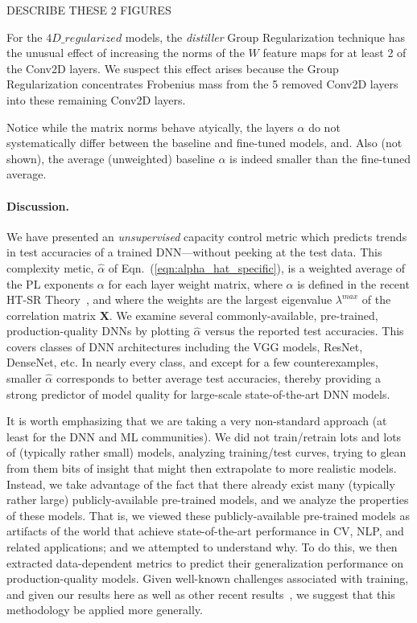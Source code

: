 DESCRIBE THESE 2 FIGURES


For the $4D\_regularized$ models, the \emph{distiller} Group Regularization technique has the unusual effect of increasing the norms of the $W$ feature maps for at least 2 of the Conv2D layers.
We suspect this effect arises because the Group Regularization  concentrates Frobenius mass from the 5 removed Conv2D layers into these remaining Conv2D layers.

Notice while the matrix norms behave atyically,  the layers $\alpha$ do not systematically differ between the baseline and fine-tuned models,
and.
Also (not shown), the average (unweighted) baseline $\alpha$ is indeed smaller than the fine-tuned average.


\paragraph{Discussion.}

We have presented an \emph{unsupervised} capacity control metric which predicts trends in test accuracies of a trained DNN---without peeking at the test data. 
This complexity metic, $\hat{\alpha}$ of Eqn.~(\ref{eqn:alpha_hat_specific}), is a weighted average of the PL exponents $\alpha$ for each layer weight matrix, where $\alpha$ is defined in the recent HT-SR Theory~\cite{MM18_TR,MM19_HTSR_ICML}, and where the weights are the largest eigenvalue $\lambda^{max}$ of the correlation matrix $\mathbf{X}$.  
%
We examine several commonly-available, pre-trained, production-quality DNNs by plotting $\hat{\alpha}$ versus the reported test accuracies.
This covers classes of DNN architectures including the VGG models, ResNet, DenseNet, etc. 
In nearly every class, and except for a few counterexamples, smaller $\hat{\alpha}$ corresponds to better average test accuracies, thereby providing a strong predictor of model quality for large-scale state-of-the-art DNN models.

It is worth emphasizing that we are taking a very non-standard approach (at least for the DNN and ML communities).
We did not train/retrain lots and lots of (typically rather small) models, analyzing training/test curves, trying to glean from them bits of insight that might then extrapolate to more realistic models.
Instead, we take advantage of the fact that there already exist many (typically rather large) publicly-available pre-trained models, and we analyze the properties of these models.
That is, we viewed these publicly-available pre-trained models as artifacts of the world that achieve state-of-the-art performance in CV, NLP, and related applications; and we attempted to understand why.
To do this, we then extracted data-dependent metrics to predict their generalization performance on production-quality models.
Given well-known challenges associated with training, and given our results here as well as other recent results~\cite{MM18_TR,MM19_HTSR_ICML},
we suggest that this methodology be applied more generally.

